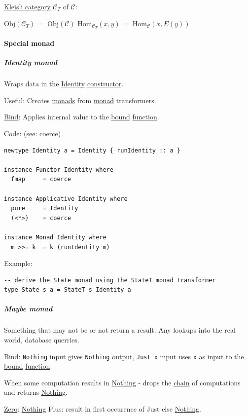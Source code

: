 \documentclass[a4paper,14pt,oneside]{book}
\begin{document}
\hyperref[orgf9da4bd]{Kleisli category} \(\mathcal{C}_{T}\) of \(\mathcal{C}\):

\(\mathrm{Obj}(\mathcal{C}_{T}) \ = \ \mathrm{Obj}(\mathcal{C})\)
\(\mathrm{Hom}_{\mathcal{C}_{T}}(x,y) \ = \ \mathrm{Hom}_{\mathcal{C}}(x,E(y))\)

\paragraph{\label{org0b34c93}Special monad}
\label{sec:org9b1ddee}
\subparagraph{\label{orge7fc08a}Identity monad}
\label{sec:org94e5cbe}
Wraps data in the \hyperref[org6510f67]{Identity} \hyperref[org31342d2]{constructor}.

Useful: Creates \hyperref[org1e2b335]{monads} from \hyperref[orgcfc6146]{monad} transformers.

\hyperref[org38aa639]{Bind}: Applies internal value to the \hyperref[org5f85414]{bound} \hyperref[orgbcd9d18]{function}.

Code: (see: coerce)

\begin{verbatim}
newtype Identity a = Identity { runIdentity :: a }

instance Functor Identity where
  fmap     = coerce

instance Applicative Identity where
  pure     = Identity
  (<*>)    = coerce

instance Monad Identity where
  m >>= k  = k (runIdentity m)
\end{verbatim}

Example:
\begin{verbatim}
-- derive the State monad using the StateT monad transformer
type State s a = StateT s Identity a
\end{verbatim}

\subparagraph{\label{org16ca370}Maybe monad}
\label{sec:org4295e25}
Something that may not be or not return a result. Any lookups into the real world, database querries.

\hyperref[org38aa639]{Bind}: \texttt{Nothing} input gives \texttt{Nothing} output, \texttt{Just x} input uses \texttt{x} as input to the \hyperref[org5f85414]{bound} \hyperref[orgbcd9d18]{function}.

When some computation results in \hyperref[orge5055f3]{Nothing} -  drops the \hyperref[org50678a2]{chain} of computations and returns \hyperref[orge5055f3]{Nothing}.

\hyperref[org710cab5]{Zero}: \hyperref[orge5055f3]{Nothing}
Plus: result in first occurence of Just else \hyperref[orge5055f3]{Nothing}.
\end{document}
